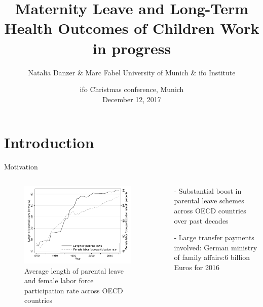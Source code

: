 \documentclass[usenames,dvipsnames]{beamer} %
\title[Maternity leave and long-run child health]{  \textbf{Maternity Leave and Long-Term Health Outcomes of Children }\newline Work in progress}
\author[Danzer \& Fabel]{Natalia Danzer \& Marc Fabel \newline University of Munich \& ifo Institute}
\date{ifo Christmas conference, Munich\\December 12, 2017}
\begin{document}
\begin{frame}
	\titlepage
\end{frame}



\section{Introduction}
\begin{frame}{Motivation}
\begin{columns}
\begin{column}{.5\textwidth}
\begin{figure}\centering
\includegraphics[width=1\textwidth]{../../analysis/graphs/SOEP/PL_OECD.pdf}
\vspace{-0.9em}
\caption{\tiny Average length of parental leave and female labor force participation rate across OECD countries}
\end{figure}
\end{column}



	\begin{column}{.57\textwidth}
\begin{itemize}
\item[-] Substantial boost in parental leave schemes across OECD countries over past decades
\item[-] Large transfer payments involved: German ministry of family affairs:\newline $6$ billion Euros for 2016 



\end{itemize}
\end{column}
\end{columns}
\end{frame}
\end{document}
